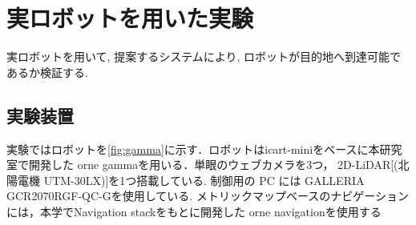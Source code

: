 \section{実ロボットを用いた実験}
実ロボットを用いて, 提案するシステムにより, ロボットが目的地へ到達可能であるか検証する.
\subsection{実験装置}
実験ではロボットを\ref{fig:gamma}に示す．ロボットはicart-miniをベースに本研究室で開発した
orne gammaを用いる．単眼のウェブカメラを3つ，
2D-LiDAR[(北陽電機 UTM-30LX)]を1つ搭載している. 
制御用の PC には GALLERIA GCR2070RGF-QC-Gを使用している.
メトリックマップベースのナビゲーションには，本学でNavigation stackをもとに開発した
orne navigationを使用する

